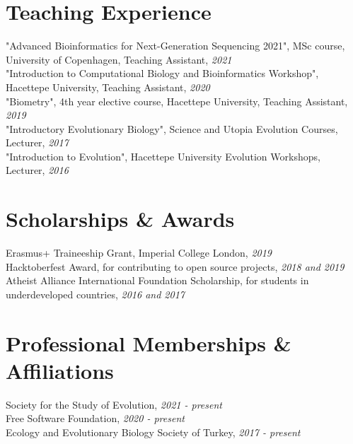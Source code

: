 \documentclass[letterpaper,10.5pt]{article}
\begin{document}
\section{Teaching Experience}
"Advanced Bioinformatics for Next-Generation Sequencing 2021", MSc course, University of Copenhagen, Teaching Assistant, \textit{2021} \\
"Introduction to Computational Biology and Bioinformatics Workshop", Hacettepe University, Teaching Assistant, \textit{2020} \\
"Biometry", 4th year elective course, Hacettepe University, Teaching Assistant, \textit{2019} \\
"Introductory Evolutionary Biology", Science and Utopia Evolution Courses, Lecturer,  \textit{2017} \\
"Introduction to Evolution", Hacettepe University Evolution Workshops, Lecturer, \textit{2016} \\


\section{Scholarships \& Awards}
Erasmus+ Traineeship Grant, Imperial College London, \textit{2019} \\
Hacktoberfest Award, for contributing to open source projects, \textit{2018 and 2019} \\
Atheist Alliance International Foundation Scholarship, for students in underdeveloped countries, \textit{2016 and 2017} \\

\section{Professional Memberships \& Affiliations}	
Society for the Study of Evolution, \textit{2021 - present} \\
Free Software Foundation, \textit{2020 - present} \\
Ecology and Evolutionary Biology Society of Turkey, \textit{2017 - present} \\
\end{document}

